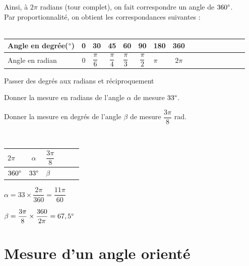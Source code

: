     Ainsi, à $2\pi$ radians (tour complet), on fait correspondre un angle de $360\degree$.\\
    Par proportionnalité, on obtient les correspondances suivantes :\\
    \ \\
    \begin{tabular}{ | Xc | Xc | Xc | Xc | Xc | Xc | Xc | Xc |}
         \hline			
           \rowcolor{NavyBlue!55!white}Angle en degrée($\degree$)  & 0 & 30 & 45 & 60 & 90 & 180 & 360 \\ \hline
           \rowcolor{NavyBlue!25!white}Angle en radian & $0$ & $\dfrac{\pi}{6}$ & $\dfrac{\pi}{4}$ & $\dfrac{\pi}{3}$ & $\dfrac{\pi}{2}$ & $\pi$ & $2\pi$ \\
         \hline  
    \end{tabular}
    
    \begin{bmethodet}{Passer des degrés aux radians et réciproquement}
        \begin{enumMet}
            \item Donner la mesure en radians de l'angle $\alpha$ de mesure $33\degree$.
            \item Donner la mesure en degrés de l'angle $\beta$ de mesure $\dfrac{3\pi}{8}$ rad.
        \end{enumMet}
        \\
            \begin{tabular}{ | Xc | Xc | Xc |}
             \hline			
               $2\pi$  & $\alpha$ & $\dfrac{3\pi}{8}$ \\ \hline
               $360\degree$ & $33\degree$ & $\beta$ \\
             \hline  
            \end{tabular}
        \begin{enumMet}
            \item $\alpha = 33\times \dfrac{2\pi}{360}=\dfrac{11\pi}{60}$
            \item $\beta = \dfrac{3\pi}{8}\times\dfrac{360}{2\pi}=67,5\degree$
        \end{enumMet}
    \end{bmethodet}
    
\section{Mesure d'un angle orienté}

